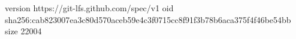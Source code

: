 version https://git-lfs.github.com/spec/v1
oid sha256:cab823007ea3c80d570aceb59e4c3f0715cc8f91f3b78b6aca375f4f46be54bb
size 22004
